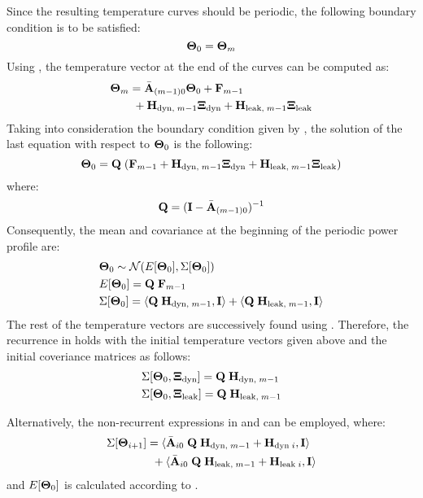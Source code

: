 Since the resulting temperature curves should be periodic, the following boundary condition is to be satisfied:
\begin{equation} \equlabel{dss-boundary}
  \vtemp_0 = \vtemp_{\stepcount}
\end{equation}
Using , the temperature vector at the end of the curves can be computed as:
\begin{align*}
  & \mathbf{\Theta}_{m} = \Bar{\mathbf{A}}_{(m - 1)0} \mathbf{\Theta}_0 + \mathbf{F}_{m - 1} \\
  & { } \qquad + \mathbf{H}_{\text{dyn}, \; m - 1} \mathbf{\Xi}_{\text{dyn}} + \mathbf{H}_{\text{leak}, \; m - 1} \mathbf{\Xi}_{\text{leak}}
\end{align*}
Taking into consideration the boundary condition given by , the solution of the last equation with respect to $\mathbf{\Theta}_0$ is the following:
\[
  \mathbf{\Theta}_0 = \mathbf{Q} \; (\mathbf{F}_{m - 1} + \mathbf{H}_{\text{dyn}, \; m - 1} \mathbf{\Xi}_{\text{dyn}} + \mathbf{H}_{\text{leak}, \; m - 1} \mathbf{\Xi}_{\text{leak}})
\]
where:
\begin{equation} \equlabel{q}
  \m{Q} = (\mone - \am{A}_{(\stepcount - 1)0})^{-1}
\end{equation}
Consequently, the mean and covariance at the beginning of the periodic power profile are:
\begin{align}
  & \vtemp_0 \sim \normal(\expect{\vtemp_0}, \cov{\vtemp_0}) \equlabel{dssta-initial-temperature-process-variation} \\
  & \expect{\vtemp_0} = \m{Q} \; \v{F}_{\stepcount - 1} \nonumber \\
  & \cov{\vtemp_0} = \dbl{\m{Q} \; \v{H}_{\dyn, \; \stepcount - 1}, \mone} + \dbl{\m{Q} \; \v{H}_{\leak, \; \stepcount - 1}, \mone} \nonumber
\end{align}
The rest of the temperature vectors are successively found using . Therefore, the recurrence in  holds with the initial temperature vectors given above and the initial coveriance matrices as follows:
\begin{align*}
  & \Sigma[\mathbf{\Theta}_0, \mathbf{\Xi}_{\text{dyn}}] = \mathbf{Q} \; \mathbf{H}_{\text{dyn}, \; m - 1} \\
  & \Sigma[\mathbf{\Theta}_0, \mathbf{\Xi}_{\text{leak}}] = \mathbf{Q} \; \mathbf{H}_{\text{leak}, \; m - 1}
\end{align*}

Alternatively, the non-recurrent expressions in  and  can be employed, where:
\begin{align*}
  & \Sigma[\mathbf{\Theta}_{i + 1}] = \langle \Bar{\mathbf{A}}_{i0} \; \mathbf{Q} \; \mathbf{H}_{\text{dyn}, \; m - 1} + \mathbf{H}_{\text{dyn} \; i}, \mathbf{I} \rangle \\
  & { } \qquad \qquad + \langle \Bar{\mathbf{A}}_{i0} \; \mathbf{Q} \; \mathbf{H}_{\text{leak}, \; m - 1} + \mathbf{H}_{\text{leak} \; i}, \mathbf{I} \rangle
\end{align*}
and $E[\mathbf{\Theta}_0]$ is calculated according to .
